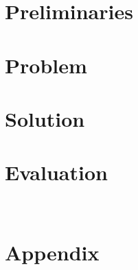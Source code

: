 \section{Preliminaries}

%
\section{Problem}

%
\section{Solution}

%
\section{Evaluation}~\label{sec:eval}












\section{Appendix}




